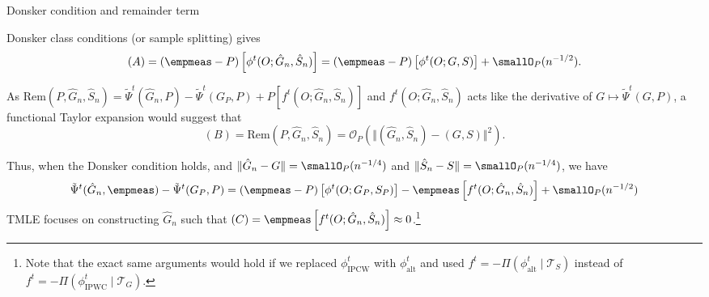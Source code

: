 \documentclass[handout]{beamer}\usepackage{listings}
\begin{document}
\begin{frame}[label={sec:org6f54abc}]{Donsker condition and remainder term}
\small

Donsker class conditions (or sample splitting) gives
\begin{equation*}
 (A) = (\empmeas-P) \left[ \phi^t(O; \hat{G}_n, \hat{S}_n) \right]
  = (\empmeas-P) \left[ \phi^t(O ; G, S) \right] + \smallO_P(n^{-1/2}).
\end{equation*}

 \vfill \pause

As $\mathrm{Rem}(P, \hat{G}_n, \hat{S}_n) = \tilde{\Psi}^t(\hat{G}_n, P) - \tilde{\Psi}^t(G_P, P) +
P[f^t(O; \hat{G}_n, \hat{S}_n)]$ and $f^t(O; \hat{G}_n, \hat{S}_n)$ acts like the derivative of $G
\mapsto \tilde{\Psi}^t(G, P)$, a functional Taylor expansion would suggest that
\begin{equation*}
  (B) = \mathrm{Rem}(P, \hat{G}_n, \hat{S}_n) = \mathcal{O}_P
  \left(
    \Vert (\hat G_n, \hat S_n) - ( G,  S) \Vert^2
  \right).
\end{equation*}

\vfill \pause   
Thus, when the Donsker condition holds, and $\Vert\hat{G}_n- G\Vert = \smallO_P(n^{-1/4})$ and
$\Vert\hat{S}_n- S\Vert = \smallO_P(n^{-1/4})$, we have
\begin{equation*}
  \tilde{\Psi}^t(\hat G_n, \empmeas) - \tilde{\Psi}^t(G_P, P)
  =  (\empmeas-P)
  \left[
    \phi^t(O; G_P, S_P)
  \right] 
  - \empmeas
  \left[
    f^t(O; \hat{G}_n, \hat{S}_n)
  \right] + \smallO_P(n^{-1/2})
\end{equation*}
\pause TMLE focuses on constructing $\hat{G}_n$ such that
$ (C) = \empmeas \left[ f^t(O; \hat{G}_n, \hat{S}_n) \right] \approx 0$.\footnote<5->{Note that the exact same
  arguments would hold if we replaced $\phi^t_{\mathrm{IPCW}}$ with $\phi^t_{\mathrm{alt}}$ and used
  $f^t=-\Pi(\phi^t_{\mathrm{alt}} \mid \mathcal{T}_S)$ instead of
  $f^t=-\Pi(\phi^t_{\mathrm{IPWC}} \mid \mathcal{T}_G)$.}   
\end{frame}
\end{document}
